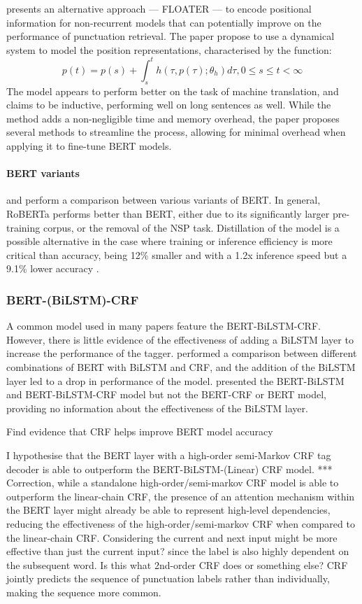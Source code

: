\documentclass[a4paper]{article}
\begin{document}
\begin{multicols}{2}
\cite{floater} presents an alternative approach --- FLOATER --- to encode positional information for non-recurrent models that can potentially improve on the performance of punctuation retrieval. The paper propose to use a dynamical system to model the position representations, characterised by the function: \[p(t)=p(s)+\int_s^t{ h(\tau,p(\tau);\theta_h)d\tau}, 0\leq s \leq t < \infty\]
The model appears to perform better on the task of machine translation, and claims to be inductive, performing well on long sentences as well. While the method adds a non-negligible time and memory overhead, the paper proposes several methods to streamline the process, allowing for minimal overhead when applying it to fine-tune BERT models.

\paragraph{BERT variants}
\cite{medicalasr} and \cite{efficientbertrobust} perform a comparison between various variants of BERT. In general, RoBERTa performs better than BERT, either due to its significantly larger pre-training corpus, or the removal of the NSP task. Distillation of the model is a possible alternative in the case where training or inference efficiency is more critical than accuracy, being 12\% smaller and with a 1.2x inference speed but a 9.1\% lower accuracy \citep{efficientbertrobust}.

\subsubsection{BERT-(BiLSTM)-CRF}
A common model used in many papers feature the BERT-BiLSTM-CRF. However, there is little evidence of the effectiveness of adding a BiLSTM layer to increase the performance of the tagger. \cite{bertcrf} performed a comparison between different combinations of BERT with BiLSTM and CRF, and the addition of the BiLSTM layer led to a drop in performance of the model. \cite{chinesebertbilstm} presented the BERT-BiLSTM and BERT-BiLSTM-CRF model but not the BERT-CRF or BERT model, providing no information about the effectiveness of the BiLSTM layer.

Find evidence that CRF helps improve BERT model accuracy

I hypothesise that the BERT layer with a high-order semi-Markov CRF tag decoder is able to outperform the BERT-BiLSTM-(Linear) CRF model. *** Correction, while a standalone high-order/semi-markov CRF model is able to outperform the linear-chain CRF, the presence of an attention mechanism within the BERT layer might already be able to represent high-level dependencies, reducing the effectiveness of the high-order/semi-markov CRF when compared to the linear-chain CRF. Considering the current and next input might be more effective than just the current input? since the label is also highly dependent on the subsequent word. Is this what 2nd-order CRF does or something else? CRF jointly predicts the sequence of punctuation labels rather than individually, making the sequence more common.


\end{multicols}
\end{document}

